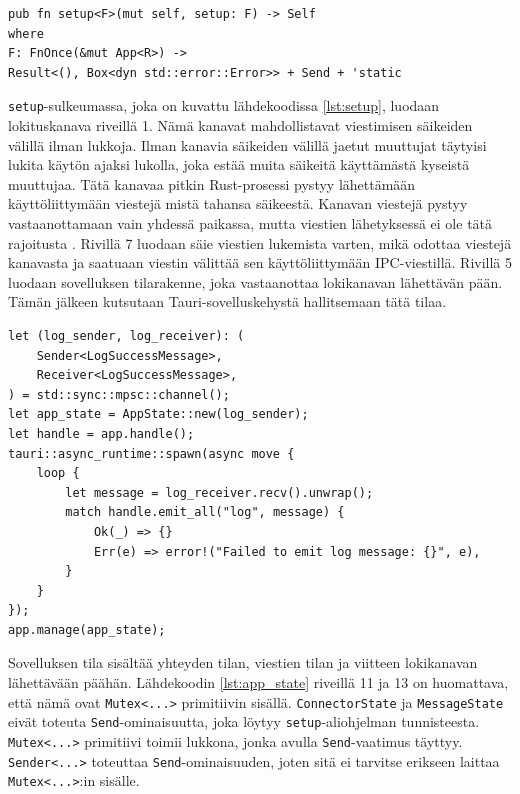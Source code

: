 \documentclass[a4paper,12pt]{article}
\begin{document}
    \begin{lstlisting}[caption={Setup-aliohjelman tunniste.}, label={lst:setup_signature}]
pub fn setup<F>(mut self, setup: F) -> Self
where
F: FnOnce(&mut App<R>) ->
Result<(), Box<dyn std::error::Error>> + Send + 'static
    \end{lstlisting}


    \lstinline{setup}-sulkeumassa, joka on kuvattu lähdekoodissa \ref{lst:setup}, luodaan lokituskanava riveillä 1. Nämä kanavat mahdollistavat viestimisen säikeiden välillä ilman lukkoja. Ilman kanavia säikeiden välillä jaetut muuttujat täytyisi lukita käytön ajaksi lukolla, joka estää muita säikeitä käyttämästä kyseistä muuttujaa. Tätä kanavaa pitkin Rust-prosessi pystyy lähettämään käyttöliittymään viestejä mistä tahansa säikeestä. Kanavan viestejä pystyy vastaanottamaan vain yhdessä paikassa, mutta viestien lähetyksessä ei ole tätä rajoitusta \cite[luku 16.2]{rust-book}. Rivillä 7 luodaan säie viestien lukemista varten, mikä odottaa viestejä kanavasta ja saatuaan viestin välittää sen käyttöliittymään IPC-viestillä. Rivillä 5 luodaan sovelluksen tilarakenne, joka vastaanottaa lokikanavan lähettävän pään. Tämän jälkeen kutsutaan Tauri-sovelluskehystä hallitsemaan tätä tilaa.
    
    \begin{lstlisting}[caption={setup-sulkeuma.}, label={lst:setup}]
let (log_sender, log_receiver): (
    Sender<LogSuccessMessage>,
    Receiver<LogSuccessMessage>,
) = std::sync::mpsc::channel();
let app_state = AppState::new(log_sender);
let handle = app.handle();
tauri::async_runtime::spawn(async move {
    loop {
        let message = log_receiver.recv().unwrap();
        match handle.emit_all("log", message) {
            Ok(_) => {}
            Err(e) => error!("Failed to emit log message: {}", e),
        }
    }
});
app.manage(app_state);\end{lstlisting}

    Sovelluksen tila sisältää yhteyden tilan, viestien tilan ja viitteen lokikanavan lähettävään päähän. Lähdekoodin \ref{lst:app_state} riveillä 11 ja 13 on huomattava, että nämä ovat \lstinline{Mutex<...>} primitiivin sisällä. \lstinline{ConnectorState} ja \lstinline{MessageState} eivät toteuta \lstinline{Send}-ominaisuutta, joka löytyy \lstinline{setup}-aliohjelman tunnisteesta. \lstinline{Mutex<...>} primitiivi toimii lukkona, jonka avulla \lstinline{Send}-vaatimus täyttyy. \lstinline{Sender<...>} toteuttaa \lstinline{Send}-ominaisuuden, joten sitä ei tarvitse erikseen laittaa \lstinline{Mutex<...>}:in sisälle.
\end{document}
